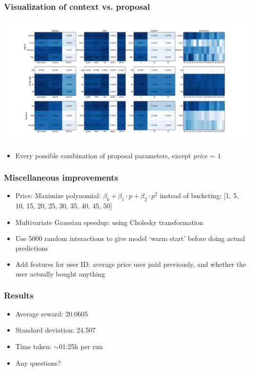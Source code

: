 \documentclass{beamer}
\begin{document}
\begin{frame}
	\frametitle{Visualization of context vs. proposal}
	\includegraphics[width=\textwidth]{viewer.png}
	\begin{itemize}
		\item Every possible combination of proposal parameters, except \emph{price} = $1$
	\end{itemize}
\end{frame}


\begin{frame}
	\frametitle{Miscellaneous improvements}
	\begin{itemize}
		\item<1,5| alert@5> Price: Maximize polynomial: $\beta_0 + \beta_1 \cdot p + \beta_2 \cdot p^2$ instead of bucketing: [1, 5, 10, 15, 20, 25, 30, 35, 40, 45, 50]
		\item<2,5| alert@5> Multivariate Gaussian speedup: using Cholesky transformation
		\item<3,5| alert@5> Use 5000 random interactions to give model `warm start' before doing actual predictions
		\item<4,5> Add features for user ID: average price user paid previously, and whether the user actually bought anything
	\end{itemize}
\end{frame}


\begin{frame}
  \frametitle{Results}

  \begin{itemize}
    \item Average reward: 20.0605
    \item Standard deviation: 24.507
    \item Time taken: $\sim$01:25h per run
    \item Any questions?
  \end{itemize}
\end{frame}
\end{document}
